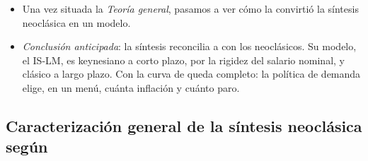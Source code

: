\documentclass[11pt]{article}
\begin{document}
\begin{itemize}
\item Una vez situada la \emph{Teoría general}, pasamos a ver cómo la convirtió la síntesis neoclásica en un modelo.
\item \emph{Conclusión anticipada}: la síntesis reconcilia a  con los neoclásicos. Su modelo, el IS-LM, es keynesiano a corto plazo, por la rigidez del salario nominal, y clásico a largo plazo. Con la curva de  queda completo: la política de demanda elige, en un menú, cuánta inflación y cuánto paro.
\end{itemize}

\subsection{Caracterización general de la síntesis neoclásica según }\label{sec:caracterizacion-sintesis}
\end{document}
